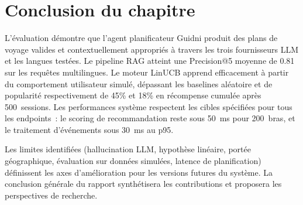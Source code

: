 \section*{Conclusion du chapitre}

L'évaluation démontre que l'agent planificateur Guidni produit des plans de voyage valides
et contextuellement appropriés à travers les trois fournisseurs LLM et les langues testées.
Le pipeline RAG atteint une Precision@5 moyenne de 0.81 sur les requêtes multilingues. Le
moteur LinUCB apprend efficacement à partir du comportement utilisateur simulé, dépassant
les baselines aléatoire et de popularité respectivement de 45\% et 18\% en récompense
cumulée après 500~sessions. Les performances système respectent les cibles spécifiées pour
tous les endpoints~: le scoring de recommandation reste sous 50~ms pour 200~bras, et le
traitement d'événements sous 30~ms au p95.

Les limites identifiées (hallucination LLM, hypothèse linéaire, portée géographique,
évaluation sur données simulées, latence de planification) définissent les axes
d'amélioration pour les versions futures du système. La conclusion générale du rapport
synthétisera les contributions et proposera les perspectives de recherche.
